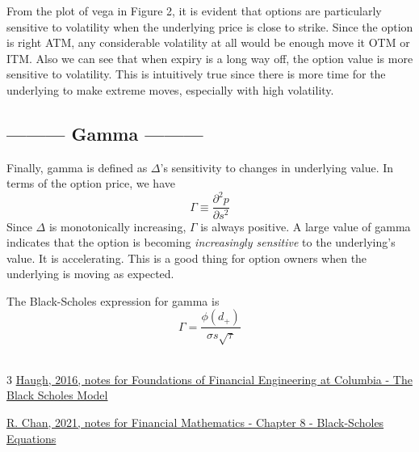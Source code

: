 \documentclass[10pt,a4paper,twocolumn]{article}
\newcommand\strategy[1]{{\centering\vspace{0.1in}\subsection*{ --------- #1 ---------}}}
\begin{document}
	From the plot of vega in Figure 2, it is evident that options are particularly sensitive to volatility when the underlying price is close to strike. Since the option is right ATM, any considerable volatility at all would be enough move it OTM or ITM. Also we can see that when expiry is a long way off, the option value is more sensitive to volatility. This is intuitively true since there is more time for the underlying to make extreme moves, especially with high volatility.
	
	
	\strategy{Gamma}
	Finally, gamma is defined as $\Delta$'s sensitivity to changes in underlying value. In terms of the option price, we have
	$$ \Gamma \equiv \frac{\partial^2 p}{\partial s^2} $$
	Since $\Delta$ is monotonically increasing, $\Gamma$ is always positive. A large value of gamma indicates that the option is becoming \emph{increasingly sensitive} to the underlying's value. It is accelerating. This is a good thing for option owners when the underlying is moving as expected.
	
	The Black-Scholes expression for gamma is
	$$ \Gamma = \frac{\phi(d_+)}{\sigma s \sqrt{\tau}} $$
	\\
	
	\begin{thebibliography}{3}
		\href{http://www.columbia.edu/~mh2078/FoundationsFE/BlackScholes.pdf}{Haugh, 2016, notes for Foundations of Financial Engineering at Columbia - The Black Scholes Model}
		
		\href{https://www.math.cuhk.edu.hk/~rchan/teaching/math4210/chap08.pdf}{R. Chan, 2021, notes for Financial Mathematics - Chapter 8 - Black-Scholes Equations}
	\end{thebibliography}
	
	
	
\end{document}
